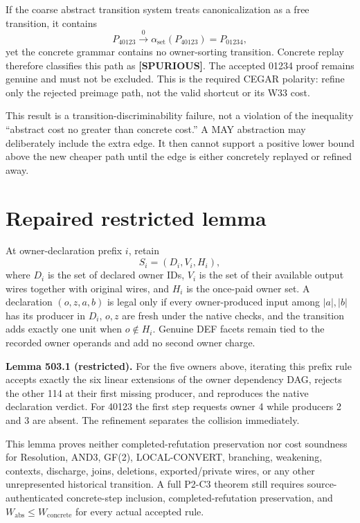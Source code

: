 \documentclass[11pt]{article}
\newcommand{\st}[1]{\textbf{[#1]}}
\begin{document}
If the coarse abstract transition system treats canonicalization as a free transition, it contains
\[
P_{40123}\xrightarrow{\;0\;}\alpha_{\mathrm{set}}(P_{40123})=P_{01234},
\]
yet the concrete grammar contains no owner-sorting transition.  Concrete replay therefore classifies this path as \st{SPURIOUS}.  The accepted 01234 proof remains genuine and must not be excluded.  This is the required CEGAR polarity: refine only the rejected preimage path, not the valid shortcut or its W33 cost.

This result is a transition-discriminability failure, not a violation of the inequality ``abstract cost no greater than concrete cost.''  A MAY abstraction may deliberately include the extra edge.  It then cannot support a positive lower bound above the new cheaper path until the edge is either concretely replayed or refined away.

\section{Repaired restricted lemma}
At owner-declaration prefix \(i\), retain
\[
S_i=(D_i,V_i,H_i),
\]
where \(D_i\) is the set of declared owner IDs, \(V_i\) is the set of their available output wires together with original wires, and \(H_i\) is the once-paid owner set.  A declaration \((o,z,a,b)\) is legal only if every owner-produced input among \(|a|,|b|\) has its producer in \(D_i\), \(o,z\) are fresh under the native checks, and the transition adds exactly one unit when \(o\notin H_i\).  Genuine DEF facets remain tied to the recorded owner operands and add no second owner charge.

\textbf{Lemma 503.1 (restricted).} For the five owners above, iterating this prefix rule accepts exactly the six linear extensions of the owner dependency DAG, rejects the other 114 at their first missing producer, and reproduces the native declaration verdict.  For 40123 the first step requests owner 4 while producers 2 and 3 are absent.  The refinement separates the collision immediately.

This lemma proves neither completed-refutation preservation nor cost soundness for Resolution, AND3, GF(2), LOCAL-CONVERT, branching, weakening, contexts, discharge, joins, deletions, exported/private wires, or any other unrepresented historical transition.  A full P2-C3 theorem still requires source-authenticated concrete-step inclusion, completed-refutation preservation, and \(W_{\mathrm{abs}}\le W_{\mathrm{concrete}}\) for every actual accepted rule.
\end{document}
